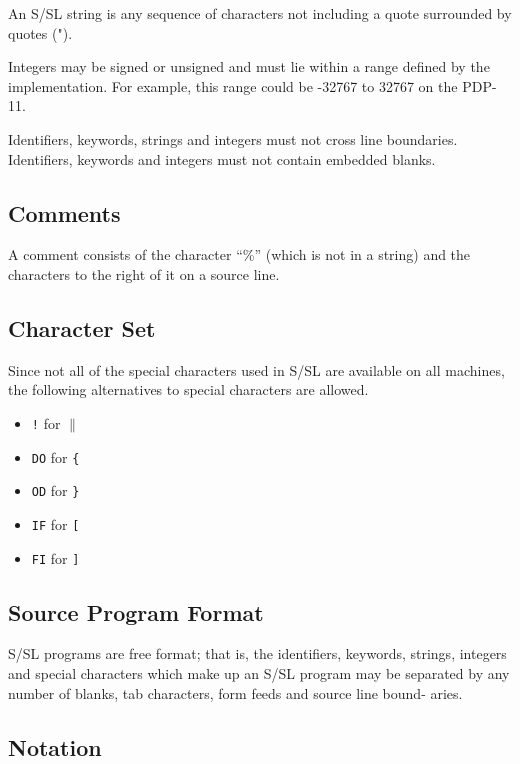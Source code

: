 An S/SL string is any sequence of characters not  
including a quote surrounded by quotes (").

Integers  may be signed or unsigned and must lie within a
range defined by  the  implementation.   For  example,  this
range could be -32767 to 32767 on the PDP-11.

Identifiers, keywords,  strings  and  integers  must not
cross line boundaries.  Identifiers, keywords  and  integers
must not contain embedded blanks.




\subsection{Comments}

A  comment consists of the character ``\%'' (which is not in
a string) and the characters to the right of it on a  source
line.




\subsection{Character Set}

Since  not all of the special characters used in S/SL are
available on all machines,  the  following  alternatives  to
special characters are allowed.
\begin{itemize}
\item {\tt !} for {\tt $\|$}
\item {\tt DO} for {\tt \{}
\item {\tt OD} for {\tt \}}
\item {\tt IF} for {\tt [}
\item {\tt FI} for {\tt ]}
\end{itemize}





\subsection{Source Program Format}

S/SL programs are free format; that is, the identifiers,
keywords, strings, integers  and  special  characters  which
make  up  an  S/SL program may be separated by any number of
blanks, tab characters, form feeds and  source  line  bound-
aries.




\subsection{Notation}

